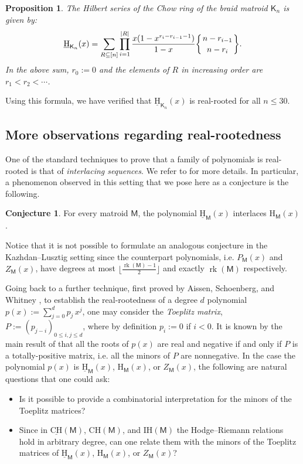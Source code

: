 \documentclass[11pt, a4paper, english]{amsart}
\newcommand{\stirlingtwo}[2]{\biggl\{\genfrac{}{}{0pt}{}{#1}{#2}\biggr\}}
\theoremstyle{teoremas}
\newtheorem{proposition}[theorem]{Proposition}
\theoremstyle{definition}
\newtheorem{conjecture}[theorem]{Conjecture}
\DeclareMathOperator{\rk}{rk}
\newcommand{\M}{\mathsf{M}}
\renewcommand{\H}{\mathrm{H}}
\newcommand{\CH}{\mathrm{CH}}
\newcommand{\IH}{\mathrm{IH}}
\newcommand{\uH}{\underline{\mathrm{H}}}
\newcommand{\uCH}{\underline{\mathrm{CH}}}
\begin{document}
\begin{proposition}
    The Hilbert series of the Chow ring of the braid matroid $\mathsf{K}_n$ is given by:
    \[ \uH_{\mathsf{K}_n}(x) = \sum_{R\subseteq [n]} \prod_{i=1}^{|R|} \frac{x(1-x^{r_i-r_{i-1}-1})}{1-x} \stirlingtwo{n-r_{i-1}}{n-r_i}.\]
    In the above sum, $r_0:=0$ and the elements of $R$ in increasing order are $r_1 < r_2 < \cdots$.
\end{proposition}

Using this formula, we have verified that $\uH_{\mathsf{K}_n}(x)$ is real-rooted for all $n\leq 30$. 

\subsection{More observations regarding real-rootedness}

One of the standard techniques to prove that a family of polynomials is real-rooted is that of \emph{interlacing sequences}. We refer to \cite[Section 7]{branden} for more details. In particular, a phenomenon observed in this setting that we pose here as a conjecture is the following.

\begin{conjecture}
    For every matroid $\M$, the polynomial $\uH_{\M}(x)$ interlaces $\H_{\M}(x)$.
\end{conjecture}

Notice that it is not possible to formulate an analogous conjecture in the Kazhdan--Lusztig setting since the counterpart polynomials, i.e. $P_{\M}(x)$ and $Z_{\M}(x)$, have degrees at most $\lfloor\frac{\rk(\M)-1}{2}\rfloor$ and exactly $\rk(\M)$ respectively.

Going back to a further technique, first proved by Aissen, Schoenberg, and Whitney \cite{aissen-schoenberg-whitney}, to establish the real-rootedness of a degree $d$ polynomial $p(x):=\sum_{j=0}^d p_j\, x^j$, one may consider the \emph{Toeplitz matrix}, $P:=(p_{j-i})_{0\leq i,j\leq d}$, where by definition $p_i:=0$ if $i<0$. It is known by the main result of \cite{aissen-schoenberg-whitney} that all the roots of $p(x)$ are real and negative if and only if $P$ is a totally-positive matrix, i.e. all the minors of $P$ are nonnegative. In the case the polynomial $p(x)$ is $\uH_{\M}(x)$, $\H_{\M}(x)$, or $Z_{\M}(x)$, the following are natural questions that one could ask:
\begin{itemize}
    \item Is it possible to provide a combinatorial interpretation for the minors of the Toeplitz matrices?
    \item Since in $\uCH(\M)$, $\CH(\M)$, and $\IH(\M)$ the Hodge--Riemann relations hold in arbitrary degree, can one relate them with the minors of the Toeplitz matrices of $\uH_{\M}(x)$, $\H_{\M}(x)$, or $Z_{\M}(x)$?
\end{itemize}
\end{document}
